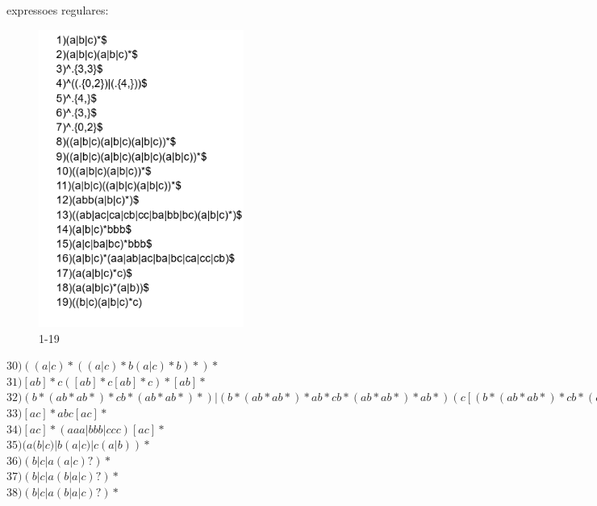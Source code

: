 \documentclass[a4paper,12pt]{article}
\begin{document}
    \newpage
    expressoes regulares:
        \begin{figure}[H]
            \centering
            \includegraphics[width=0.6\textwidth]{Aula03/Daniel/ER.png}
            \caption*{1-19}
        \end{figure}

    $30) ((a|c)*((a|c)*b(a|c)*b)*)*$ \\

    $31) [ab]*c([ab]*c[ab]*c)*[ab]*$ \\

    $32) (b*(ab*ab*)*cb*(ab*ab*)*)|(b*(ab*ab*)*ab*cb*(ab*ab*)*ab*)(c[(b*(ab*ab*)*cb*(ab*ab*)*)|(b*(ab*ab*)*ab*cb*(ab*ab*)*ab*)])*$ \\

    $33) [ac]*abc[ac]*$ \\

    $34) [ac]*(aaa|bbb|ccc)[ac]*$ \\

    $35) (a(b|c)|b(a|c)|c(a|b))*$ \\

    $36) (b|c|a(a|c)?)*$ \\

    $37) (b|c|a(b|a|c)?)*$ \\

    $38) (b|c|a(b|a|c)?)*$ \\
\end{document}
